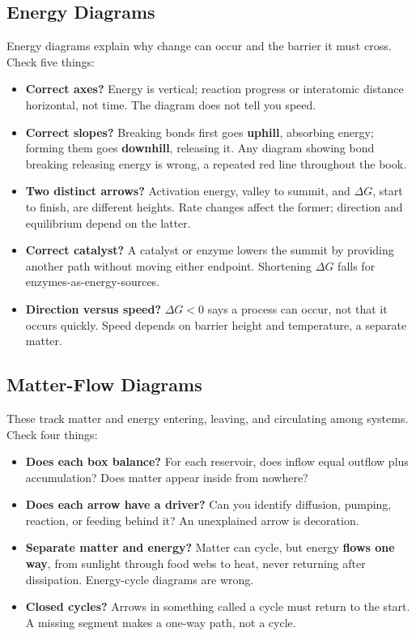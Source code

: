 \subsection{Energy Diagrams}

Energy diagrams explain why change can occur and the barrier it must cross. Check five things:

\begin{itemize}[itemsep=2pt]
\item \textbf{Correct axes?} Energy is vertical; reaction progress or interatomic distance horizontal, not time. The diagram does not tell you speed.
\item \textbf{Correct slopes?} Breaking bonds first goes \textbf{uphill}, absorbing energy; forming them goes \textbf{downhill}, releasing it. Any diagram showing bond breaking releasing energy is wrong, a repeated red line throughout the book.
\item \textbf{Two distinct arrows?} Activation energy, valley to summit, and $\Delta G$, start to finish, are different heights. Rate changes affect the former; direction and equilibrium depend on the latter.
\item \textbf{Correct catalyst?} A catalyst or enzyme lowers the summit by providing another path without moving either endpoint. Shortening $\Delta G$ falls for enzymes-as-energy-sources.
\item \textbf{Direction versus speed?} $\Delta G<0$ says a process can occur, not that it occurs quickly. Speed depends on barrier height and temperature, a separate matter.
\end{itemize}

\subsection{Matter-Flow Diagrams}

These track matter and energy entering, leaving, and circulating among systems. Check four things:

\begin{itemize}[itemsep=2pt]
\item \textbf{Does each box balance?} For each reservoir, does inflow equal outflow plus accumulation? Does matter appear inside from nowhere?
\item \textbf{Does each arrow have a driver?} Can you identify diffusion, pumping, reaction, or feeding behind it? An unexplained arrow is decoration.
\item \textbf{Separate matter and energy?} Matter can cycle, but energy \textbf{flows one way}, from sunlight through food webs to heat, never returning after dissipation. Energy-cycle diagrams are wrong.
\item \textbf{Closed cycles?} Arrows in something called a cycle must return to the start. A missing segment makes a one-way path, not a cycle.
\end{itemize}


